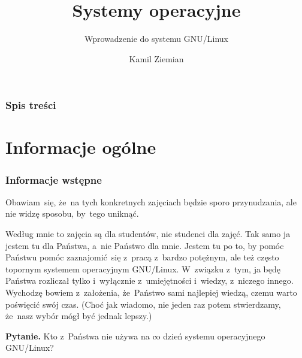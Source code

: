 \documentclass[10pt,t]{beamer}
\title{Systemy operacyjne}
\subtitle{Wprowadzenie do systemu GNU/Linux}
\author{Kamil Ziemian}
\begin{document}





\RaggedRight





\maketitle





\begin{frame}
  \frametitle{Spis treści}


  \tableofcontents

\end{frame}





\section{Informacje ogólne}



\begin{frame}
  \frametitle{Informacje wstępne}


  Obawiam~się, że~na tych konkretnych zajęciach będzie sporo przynudzania,
  ale nie widzę sposobu, by~tego uniknąć.

  Według mnie to zajęcia są dla studentów, nie studenci dla zajęć. Tak samo
  ja jestem tu dla Państwa, a~nie Państwo dla mnie. Jestem tu po to, by
  pomóc Państwu pomóc zaznajomić~się z~pracą z~bardzo potężnym, ale też
  często topornym systemem operacyjnym GNU/Linux. W~związku z~tym,
  ja będę Państwa rozliczał tylko i~wyłącznie z~umiejętności i~wiedzy,
  z~niczego innego. Wychodzę bowiem z~założenia, że~Państwo sami najlepiej
  wiedzą, czemu warto poświęcić swój czas. (Choć jak wiadomo, nie jeden raz
  potem stwierdzamy, że~nasz wybór mógł być jednak lepszy.)

  \textbf{Pytanie.} Kto z~Państwa \alert{nie} używa na co dzień systemu
  operacyjnego GNU/Linux?

\end{frame}
\end{document}
